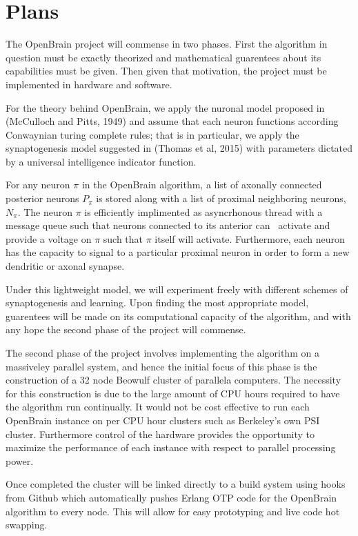 \documentclass[letter]{article}
\begin{document}
\section{Plans}
The OpenBrain project will commense in two phases. First the algorithm in question must be exactly theorized and mathematical
guarentees about its capabilities must be given. Then given that motivation, the project must be implemented in hardware and software.

For the theory behind OpenBrain, we apply the nuronal model proposed in (McCulloch and Pitts, 1949) and assume that each neuron
functions according Conwaynian turing complete rules; that is in particular, we apply the synaptogenesis model suggested in
(Thomas et al, 2015) with parameters dictated by a universal intelligence indicator function.

For any neuron $\pi$ in the OpenBrain algorithm, a list of axonally connected posterior neurons $P_\pi$ is stored along with
a list of proximal neighboring neurons, $N_\pi.$ The neuron $\pi$ is efficiently implimented as asyncrhonous thread with a message
queue such that neurons connected to its anterior can \ activate and provide a voltage on $\pi$ such that $\pi$ itself
will activate. Furthermore, each neuron has the capacity to signal to a particular proximal neuron in order to form a new dendritic or axonal
synapse.

Under this lightweight model, we will experiment freely with different schemes of synaptogenesis and learning. Upon finding the most
appropriate model, guarentees will be made on its computational capacity of the algorithm, and with any hope the second
phase of the project will commense.

The second phase of the project involves implementing the algorithm on a massiveley parallel system, and hence the initial
focus of this phase is the construction of a 32 node Beowulf cluster of parallela computers. The necessity for this construction
is due to the large amount of CPU hours required to have the algorithm run continually. It would not be cost effective to run
each OpenBrain instance on per CPU hour clusters such as Berkeley's own PSI cluster.  Furthermore control of the hardware
provides the opportunity to maximize the performance of each instance with respect to parallel processing power.

Once completed the cluster will be linked directly to a build system using hooks from Github which automatically pushes Erlang
OTP code for the OpenBrain algorithm to every node. This will allow for easy prototyping and live code hot swapping.
\end{document}
